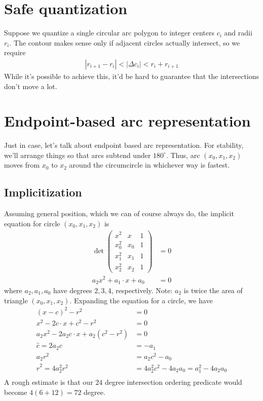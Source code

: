\documentclass[11pt]{article}
\begin{document}
\section{Safe quantization}

Suppose we quantize a single circular arc polygon to integer centers $c_i$ and radii $r_i$.  The contour makes sense only if adjacent circles
actually intersect, so we require
\begin{align*}
|r_{i+1} - r_i| < |\Delta c_i| < r_i + r_{i+1}
\end{align*}
While it's possible to achieve this, it'd be hard to guarantee that the intersections don't move a lot.

\section{Endpoint-based arc representation}

Just in case, let's talk about endpoint based arc representation.  For stability, we'll arrange things so that arcs subtend under $180^\circ$.
Thus, arc $(x_0,x_1,x_2)$ moves from $x_0$ to $x_2$ around the circumcircle in whichever way is fastest.

\subsection{Implicitization}

Assuming general position, which we can of course always do, the implicit equation for circle $(x_0,x_1,x_2)$ is
\begin{align*}
\det \left(\begin{array}{ccc}
  x^2 & x & 1 \\
  x_0^2 & x_0 & 1 \\
  x_1^2 & x_1 & 1 \\
  x_2^2 & x_2 & 1
\end{array} \right ) &= 0 \\
a_2 x^2 + a_1 \cdot x + a_0 &= 0
\end{align*}
where $a_2, a_1, a_0$ have degrees $2, 3, 4$, respectively.  Note: $a_2$ is twice the area of triangle $(x_0,x_1,x_2)$.  Expanding the equation for
a circle, we have
\begin{align*}
(x - c)^2 - r^2 &= 0 \\
x^2 - 2c \cdot x + c^2 - r^2 &= 0 \\
a_2 x^2 - 2a_2 c \cdot x + a_2 (c^2 - r^2) &= 0 \\
\hat{c} = 2 a_2 c &= -a_1 \\
a_2 r^2 &= a_2 c^2 - a_0 \\
\hat{r}^2 = 4 a_2^2 r^2 &= 4 a_2^2 c^2 - 4 a_2 a_0 = a_1^2 - 4 a_2 a_0 \\
\end{align*}
A rough estimate is that our $24$ degree intersection ordering predicate would become $4(6+12) = 72$ degree.
\end{document}
